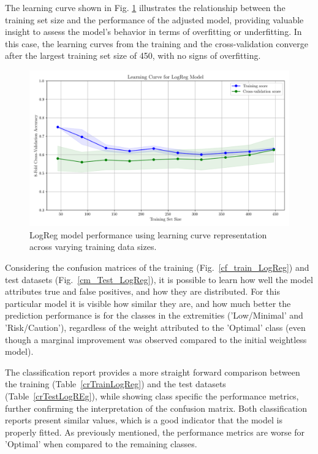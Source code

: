 \documentclass[conference]{IEEEtran}
\begin{document}
The learning curve shown in Fig. \ref{lcLogReg} illustrates the relationship between the training set size and the performance of the adjusted model, providing valuable insight to assess the model's behavior in terms of overfitting or underfitting. In this case, the learning curves from the training and the cross-validation converge after the largest training set size of 450, with no signs of overfitting.

\begin{figure}[H]
    \centering
    \includegraphics[width=1\linewidth]{assets/LOGR_lercurve.png}
    \caption{LogReg model performance using learning curve representation across varying training data sizes.}
    \label{lcLogReg}
\end{figure} %

Considering the confusion matrices of the training (Fig.~\ref{cf_train_LogReg}) and test datasets (Fig.~\ref{cm_Test_LogReg}), it is possible to learn how well the model attributes true and false positives, and how they are distributed. For this particular model it is visible how similar they are, and how much better the prediction performance is for the classes in the extremities ('Low/Minimal' and 'Risk/Caution'), regardless of the weight attributed to the 'Optimal' class (even though a marginal improvement was observed compared to the initial weightless model).

The classification report provides a more straight forward comparison between the training (Table~\ref{crTrainLogReg}) and the test datasets (Table~\ref{crTestLogREg}), while showing class specific the performance metrics, further confirming the interpretation of the confusion matrix. Both classification reports present similar values, which is a good indicator that the model is properly fitted. As previously mentioned, the performance metrics are worse for 'Optimal' when compared to the remaining classes.
\end{document}
